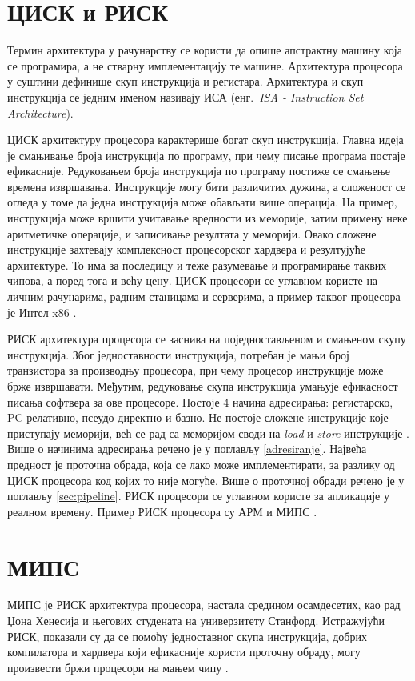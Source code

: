 \documentclass[12pt,oneside]{memoir}
\begin{document}
\section{ЦИСК и РИСК}
\label{ciscrisc}
Термин архитектура у рачунарству се користи да опише апстрактну машину која се програмира, а не стварну имплементацију те машине. Архитектура процесора у суштини дефинише скуп инструкција и регистара. Архитектура и скуп инструкција се једним именом називају ИСА (енг.~\textit{ISA - Instruction Set Architecture})\cite{isa}.

ЦИСК архитектуру процесора карактерише богат скуп инструкција. Главна идеја је смањивање броја инструкција по програму, при чему писање програма постаје ефикасније. Редуковањем броја инструкција по програму постиже се смањење времена извршавања. Инструкције могу бити различитих дужина, а сложеност се огледа у томе да једна инструкција може обављати више операција. На пример, инструкција може вршити учитавање вредности из меморије, затим примену неке аритметичке операције, и записивање резултата у меморији. Овако сложене инструкције захтевају комплексност процесорског хардвера и резултујуће архитектуре. То има за последицу и теже разумевање и програмирање таквих чипова, а поред тога и већу цену.
ЦИСК процесори се углавном користе на личним рачунарима, радним станицама и серверима, а пример таквог процесора је Интел x86 \cite{mips, risc_vs_cisc}.

РИСК архитектура процесора се заснива на поједностављеном и смањеном скупу инструкција. Због једноставности инструкција, потребан је мањи број транзистора за производњу процесора, при чему процесор инструкције може брже извршавати. Међутим, редуковање скупа инструкција умањује ефикасност писања софтвера за ове процесоре. 
Постоје 4 начина адресирања: регистарско, PC-релативно, псеудо-директно и базно. Не постоје сложене инструкције које приступају меморији, већ се рад са меморијом своди на \textit{load} и \textit{store} инструкције \cite{mips, risc_vs_cisc}. Више о начинима адресирања речено је у поглављу \ref{adresiranje}.
Највећа предност је проточна обрада, која се лако може имплементирати, за разлику од ЦИСК процесора код којих то није могуће. Више о проточној обради речено је у поглављу \ref{sec:pipeline}. РИСК процесори се углавном користе за апликације у реалном времену. Пример РИСК процесора су АРМ и МИПС .

\section{МИПС}
\label{mips}
МИПС је РИСК архитектура процесора, настала средином осамдесетих, као рад Џона Хенесија и његових студената на универзитету Станфорд. Истражујући РИСК, показали су да се помоћу једноставног скупа инструкција, добрих компилатора и хардвера који ефикасније користи проточну обраду, могу произвести бржи процесори на мањем чипу \cite{mips}.
\end{document}
